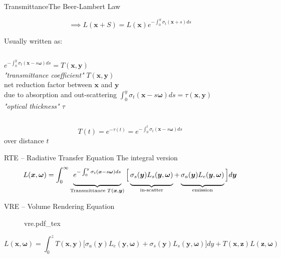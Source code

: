 \documentclass[
  english,            %
  aspectratio=169,    %
]{tumbeamer}
\newcommand\bx[0]{\bm{x}}
\newcommand\by[0]{\bm{y}}
\newcommand\bomega[0]{\bm{\omega}}
\newcommand*\mystrut[1]{\vrule width0pt height0pt depth#1\relax}
\newcommand{\incfig}[1]{%
    \def\svgwidth{\columnwidth}
    {#1.pdf_tex}
}
\begin{document}
\begin{frame}{Transmittance}{The Beer-Lambert Law}
\begin{figure}[ht]
$$ \implies L(\bx + S) = L(\bx)e^{-\int_0^S \sigma_t(\bx+s)ds} $$
\end{figure}

Usually written as:\\
\begin{columns}[t, onlytextwidth]
    $e^{-\int_0^y \sigma_t(\bx-s\bomega)ds} = T(\bx, \by)$
    \\
    \textit{"transmittance coefficient"} $T(\bx, \by)$\\
    net reduction factor between $\bx$ and $\by$ \\due to absorption and
    out-scattering
    $\int_0^y \sigma_t(\bx-s\bomega)ds = \tau(\bx,\by)$\\
    \textit{"optical thickness" $\tau$}
\end{columns}

\vfill
$$ T(t) = e^{-\tau(t)} = e^{-\int_0^t \sigma_t(\bx-s\bomega)ds} $$
    \centering over distance $t$

\end{frame}

\begin{frame}{RTE -- Radiative Transfer Equation}
    {The integral version}
    \vfill
    \begin{equation}
        L(\bx, \bomega) = \int_0^\infty 
        \underbrace{\mystrut{2ex}
            e^{-\int_0^y{\sigma_t(\bx-s\bomega)}ds}
        }_{\text{Transmittance } T(\bx, \by)}
        \Big[
            \underbrace{\mystrut{2ex}
                \sigma_s(\by)L_s(\by, \bomega)
            }_{\text{in-scatter}}
            + 
            \underbrace{\mystrut{2ex}
                \sigma_a(\by)L_e(\by, \bomega)
            }_{\text{emission}}
        \Big]
        d\by
    \end{equation}
    \vfill
\end{frame}

\begin{frame}{VRE -- Volume Rendering Equation}
    \begin{figure}[ht]
        \centering
        \incfig{vre}
        \label{fig:vre}
    \end{figure}
    \begin{equation}
    L(\bx, \bomega) = \int_{0}^{z} 
        T(\bx, \by)
        \big[ 
            \sigma_a(\by)L_e(\by, \bomega) + 
            \sigma_s(\by)L_s(\by, \bomega)
        \big] dy
        + 
        T(\bx, \textbf{z})L(\textbf{z},\bomega)
    \end{equation}
\end{frame}
\end{document}
